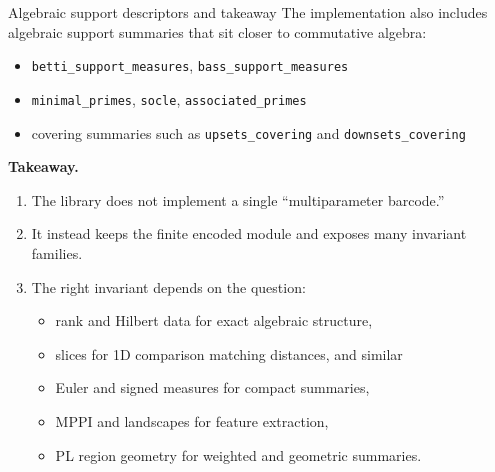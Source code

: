 \documentclass[aspectratio=169,11pt]{beamer}
\begin{document}
\begin{frame}{Algebraic support descriptors and takeaway}
\small
The implementation also includes algebraic support summaries that sit closer to commutative algebra:
\begin{itemize}
  \item \texttt{betti\_support\_measures}, \texttt{bass\_support\_measures}
  \item \texttt{minimal\_primes}, \texttt{socle}, \texttt{associated\_primes}
  \item covering summaries such as \texttt{upsets\_covering} and \texttt{downsets\_covering}
\end{itemize}

\medskip
\textbf{Takeaway.}
\begin{enumerate}
  \item The library does not implement a single ``multiparameter barcode.''
  \item It instead keeps the finite encoded module and exposes many invariant families.
  \item The right invariant depends on the question:
  \begin{itemize}
    \item rank and Hilbert data for exact algebraic structure,
    \item slices for 1D comparison matching distances, and similar
    \item Euler and signed measures for compact summaries,
    \item MPPI and landscapes for feature extraction,
    \item PL region geometry for weighted and geometric summaries.
  \end{itemize}
\end{enumerate}
\end{frame}
\end{document}
